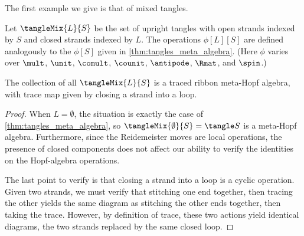 
The first example we give is that of mixed tangles.

\begin{definition}
        Let $\tangleMix{L}{S}$ be the set of upright tangles with open
        strands indexed by $S$ and closed strands indexed by $L$. The operations
        $ϕ[L][S]$ are defined analogously to the $ϕ[S]$ given in
        \cref{thm:tangles_meta_algebra}. (Here $ϕ$ varies over $\mult$, $\unit$,
        $\comult$, $\counit$, $\antipode$, $\Rmat$, and $\spin$.)
\end{definition}

\begin{lemma}
        The collection of all $\tangleMix{L}{S}$ is a traced ribbon meta-Hopf
        algebra, with trace map given by closing a strand into a loop.
\end{lemma}
\begin{proof}
        When $L = \emptyset$, the situation is exactly the case of
        \cref{thm:tangles_meta_algebra}, so
        $\tangleMix{\emptyset}{S} = \tangle S$ is a
        meta-Hopf algebra. Furthermore, since the Reidemeister moves are local
        operations, the presence of closed components does not affect our
        ability to verify the identities on the Hopf-algebra operations.

        The last point to verify is that closing a strand into a loop is a
        cyclic operation. Given two strands, we must verify that stitching one
        end together, then tracing the other yields the same diagram as
        stitching the other ends together, then taking the trace. However, by
        definition of trace, these two actions yield identical diagrams, the two
        strands replaced by the same closed loop.
\end{proof}

